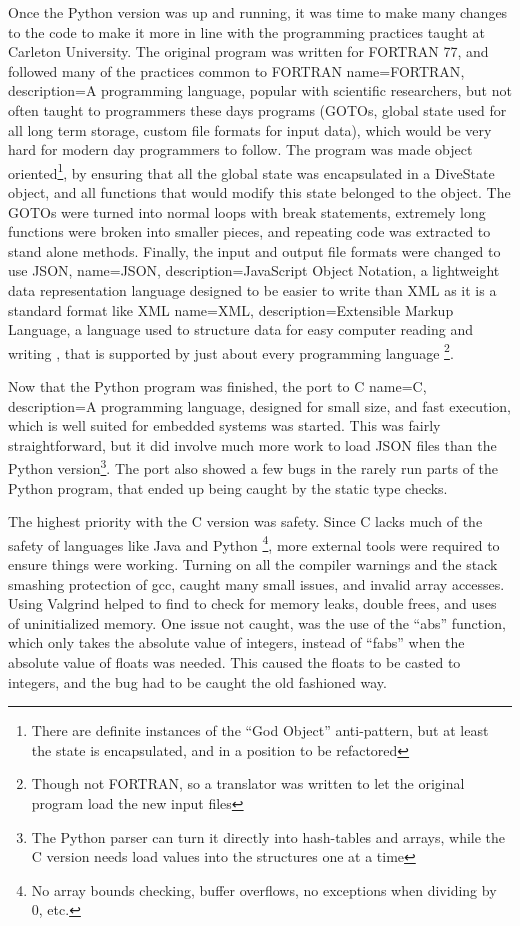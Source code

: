 \documentclass[12pt]{article}
\begin{document}
 Once the Python version was up and running, it was time to make many changes to the code to make it more
in line with the programming practices taught at Carleton University. The original program was written for FORTRAN 77,
and followed many of the practices common to FORTRAN {name={FORTRAN}, description={A programming language, popular with scientific researchers, but
not often taught to programmers these days}}
programs (GOTOs, global state used for all long term storage,
custom file formats for input data), which would be very hard for modern day programmers to follow. The program
was made object oriented\footnote{There are definite instances of the ``God Object'' anti-pattern, but at least the state is encapsulated, and in a position to be refactored}, by ensuring that all the global state was encapsulated in a DiveState object, and all functions that would modify this state belonged to the object.
The GOTOs were turned into normal loops with break statements, extremely long functions were broken into smaller
pieces, and repeating code was extracted to stand alone methods. Finally,  the input and output file formats were changed
to use JSON, {name={JSON}, description={JavaScript Object Notation, a lightweight data representation language
designed to be easier to write than XML}}
 as it is a standard format like XML {name={XML}, description={Extensible Markup Language, a language used
to structure data for easy computer reading and writing}}
, that is supported by just about every programming language \footnote{Though not FORTRAN, so a translator was written to let the original program load the new input files}.

 Now that the Python program was finished, the port to C {name={C}, description={A programming language, designed for small size, and fast execution, which is 
well suited for embedded systems}}
 was started. This was fairly straightforward, but it did involve
much more work to load JSON files than the Python version\footnote{The Python parser can turn it 
directly into hash-tables and arrays, while the C version
needs load values into the structures one at a time}. The port also showed a few bugs in the rarely run parts
of the Python program, that ended up being caught by the static type checks.

The highest priority with the C version was safety. Since C lacks much of the safety of languages
like Java and Python \footnote{No array bounds checking, buffer overflows, no exceptions when dividing by 0, etc.}, more
external tools were required to ensure things were working. Turning on all the compiler warnings and the stack
smashing protection of gcc, caught many small issues, and invalid array accesses. Using Valgrind helped to find
to check for memory leaks, double frees, and uses of uninitialized memory. One issue not caught, was the use
of the ``abs'' function, which only takes the absolute value of integers, instead of ``fabs'' when the absolute value of floats was needed. This caused the floats to be casted to integers, and the bug had to be caught the old fashioned way.
\end{document}
